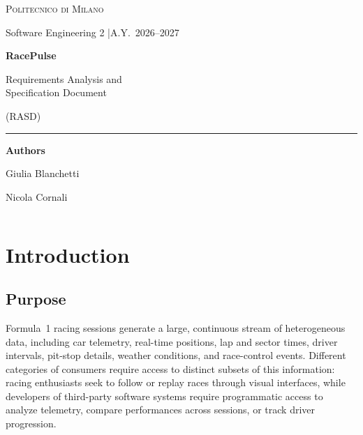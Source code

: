 \documentclass[11pt,a4paper]{article}
\newcommand{\RP}{RacePulse}
\begin{document}
\begin{titlepage}
\thispagestyle{empty}
\centering
\vspace*{2.2cm}
{\large\color{accent}\scshape Politecnico di Milano\par}
{\normalsize Software Engineering 2 \quad|\quad A.Y.\ 2026--2027\par}
\vspace{2.6cm}
{\fontsize{34}{40}\selectfont\bfseries\color{accent}\RP\par}
\vspace{0.6cm}
{\Large Requirements Analysis and\\[2pt] Specification Document\par}
\vspace{0.4cm}
{\large (RASD)\par}
\vspace{1.4cm}
\textcolor{accent}{\rule{6cm}{0.8pt}}\par
\vspace{1.4cm}
{\large\bfseries Authors\par}
\vspace{0.4cm}
{\large Giulia Blanchetti \par}
{\large Nicola Cornali \par}
\vfill
\begin{tabular}{rl}
\end{tabular}
\vspace{1.5cm}
\end{titlepage}

\setcounter{page}{2}
\renewcommand{\contentsname}{Table of Contents}
\tableofcontents
\clearpage


\section{Introduction}

\subsection{Purpose}
Formula~1 racing sessions generate a large, continuous stream of heterogeneous data, including car telemetry,
real-time positions, lap and sector times, driver intervals, pit-stop details, weather conditions, and
race-control events. Different categories of consumers require access to distinct subsets of this information:
racing enthusiasts seek to follow or replay races through visual interfaces, while developers of third-party
software systems require programmatic access to analyze telemetry, compare performances across sessions, or
track driver progression.
\end{document}
